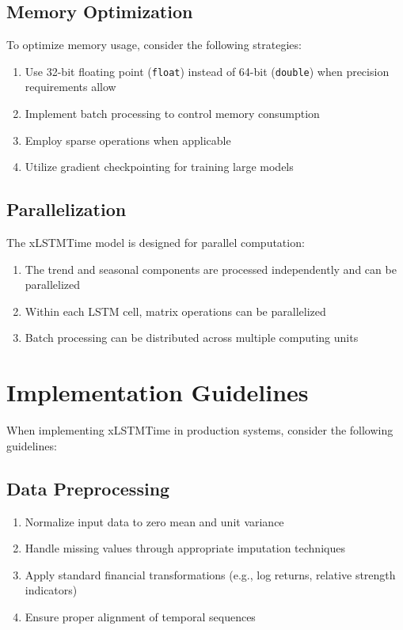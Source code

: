 \documentclass[11pt,a4paper]{article}
\begin{document}
\subsection{Memory Optimization}

To optimize memory usage, consider the following strategies:
\begin{enumerate}
    \item Use 32-bit floating point (\texttt{float}) instead of 64-bit (\texttt{double}) when precision requirements allow
    \item Implement batch processing to control memory consumption
    \item Employ sparse operations when applicable
    \item Utilize gradient checkpointing for training large models
\end{enumerate}

\subsection{Parallelization}

The xLSTMTime model is designed for parallel computation:
\begin{enumerate}
    \item The trend and seasonal components are processed independently and can be parallelized
    \item Within each LSTM cell, matrix operations can be parallelized
    \item Batch processing can be distributed across multiple computing units
\end{enumerate}

\section{Implementation Guidelines}

When implementing xLSTMTime in production systems, consider the following guidelines:

\subsection{Data Preprocessing}

\begin{enumerate}
    \item Normalize input data to zero mean and unit variance
    \item Handle missing values through appropriate imputation techniques
    \item Apply standard financial transformations (e.g., log returns, relative strength indicators)
    \item Ensure proper alignment of temporal sequences
\end{enumerate}
\end{document}
